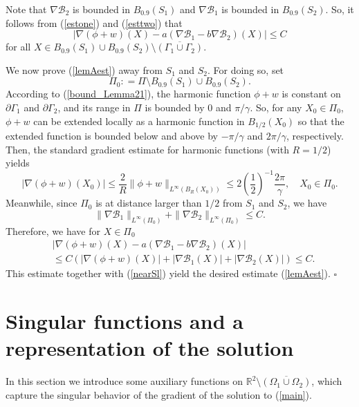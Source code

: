 \documentclass[11pt,a4paper]{article}
\numberwithin{equation}{section}
\newcommand{\qed}{\hfill \ensuremath{\square}}
\newcommand{\p}{\partial}
\newcommand{\eqnref}[1]{(\ref {#1})}
\newcommand{\Rbb}{\mathbb{R}}
\newcommand{\Bcal}{\mathcal{B}}
\newcommand{\Gf}{\phi}
\newcommand{\Gg}{\gamma}
\newcommand{\GG}{\Gamma}
\newcommand{\GO}{\Omega}
\newcommand{\beq}{\begin{equation}}
\newcommand{\eeq}{\end{equation}}
\begin{document}
Note that $\nabla \Bcal_2$ is bounded in $B_{0.9}(S_1)$ and $\nabla \Bcal_1$ is bounded in $B_{0.9}(S_2)$. So, it follows from \eqnref{estone} and \eqnref{esttwo} that
\beq\label{nearSl}
|\nabla \left( \Gf + w\right)(X)  - a \left(\nabla \Bcal_1 - b \nabla \Bcal_2 \right)(X) | \le C
\eeq
for all $X \in B_{0.9}(S_1) \cup B_{0.9}(S_2) \setminus \overline {\left(\GG_1 \cup \GG_2 \right)}$.


We now prove \eqnref{lemAest} away from $S_1$ and $S_2$. For doing so, set
$$
\Pi_0: = \Pi \setminus B_{0.9}(S_1) \cup B_{0.9}(S_2).
$$
According to \eqnref{bound_Lemma21}, the harmonic function $\Gf + w$ is constant on $\p \GG_1$ and $\p \GG_2$, and its range in $\Pi$ is bounded by $0$ and $\pi/\Gg$. So, for any $X_0 \in \Pi_0$, $\Gf + w$ can be extended locally as a harmonic function in $B_{1/2} (X_0)$ so that the extended function is bounded below and above by $-\pi/\Gg$ and $2\pi/\Gg$, respectively. Then, the standard gradient estimate for harmonic functions (with $R=1/2$) yields
\beq\label{standard}
\left | \nabla  \left(\Gf +  w \right) (X_0) \right| \leq \frac{2}{R} \| \Gf +  w \|_{L^\infty(B_R(X_0))} \le 2 \left( \frac 1 2 \right)^{-1}  \frac{2\pi}{\Gg}, \quad X_0 \in \Pi_0 .
\eeq
Meanwhile, since $\Pi_0$ is at distance larger than $1/2$ from $S_1$ and $S_2$, we have
$$
\| \nabla \Bcal_1 \|_{L^{\infty}(\Pi_0)} +  \| \nabla \Bcal_2 \|_{L^{\infty}(\Pi_0)} \le C.
$$
Therefore, we have for $X \in \Pi_0$
\begin{align*}
& |\nabla \left( \Gf + w\right)(X)  - a \left(\nabla \Bcal_1 - b \nabla \Bcal_2 \right)(X) | \\
& \le C(|\nabla \left( \Gf + w\right)(X)| + |\nabla \Bcal_1(X)| + |\nabla \Bcal_2 (X) |) \le C.
\end{align*}
This estimate together with \eqnref{nearSl} yield the desired estimate \eqnref{lemAest}.
\qed

\section{Singular functions and a representation of the solution}\label{sec:singular}

In this section we introduce some auxiliary functions on $\Rbb^2 \setminus \overline {(\GO_{1} \cup \GO_{2})}$, which capture the singular behavior of the gradient of the solution to \eqnref{main}.
\end{document}
